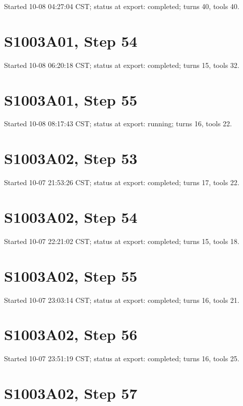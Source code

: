 \documentclass[
  10pt,
]{report}
\begin{document}
Started 10-08 04:27:04 CST; status at export: completed; turns 40, tools
40.

\hypertarget{s1003a01-step-54}{%
\section{S1003A01, Step 54}\label{s1003a01-step-54}}

Started 10-08 06:20:18 CST; status at export: completed; turns 15, tools
32.

\hypertarget{s1003a01-step-55}{%
\section{S1003A01, Step 55}\label{s1003a01-step-55}}

Started 10-08 08:17:43 CST; status at export: running; turns 16, tools
22.

\hypertarget{s1003a02-step-53}{%
\section{S1003A02, Step 53}\label{s1003a02-step-53}}

Started 10-07 21:53:26 CST; status at export: completed; turns 17, tools
22.

\hypertarget{s1003a02-step-54}{%
\section{S1003A02, Step 54}\label{s1003a02-step-54}}

Started 10-07 22:21:02 CST; status at export: completed; turns 15, tools
18.

\hypertarget{s1003a02-step-55}{%
\section{S1003A02, Step 55}\label{s1003a02-step-55}}

Started 10-07 23:03:14 CST; status at export: completed; turns 16, tools
21.

\hypertarget{s1003a02-step-56}{%
\section{S1003A02, Step 56}\label{s1003a02-step-56}}

Started 10-07 23:51:19 CST; status at export: completed; turns 16, tools
25.

\hypertarget{s1003a02-step-57}{%
\section{S1003A02, Step 57}\label{s1003a02-step-57}}
\end{document}
